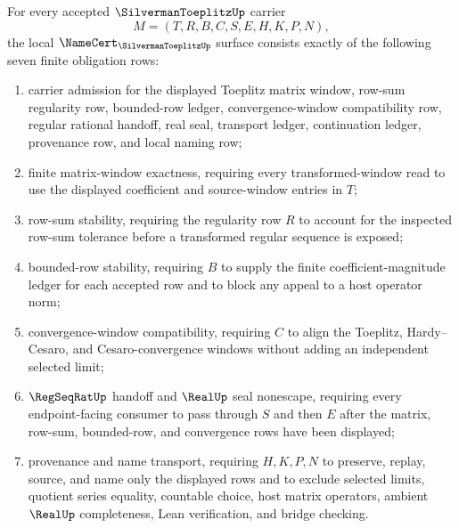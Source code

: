 \begin{theorem}\label{thm:silverman-toeplitz-namecert-obligations}
For every accepted $\SilvermanToeplitzUp$ carrier
$$
M=(T,R,B,C,S,E,H,K,P,N),
$$
the local $\NameCert_{\SilvermanToeplitzUp}$ surface consists exactly of the following seven finite obligation rows:
\begin{enumerate}
\item carrier admission for the displayed Toeplitz matrix window, row-sum regularity row, bounded-row ledger, convergence-window compatibility row, regular rational handoff, real seal, transport ledger, continuation ledger, provenance row, and local naming row;
\item finite matrix-window exactness, requiring every transformed-window read to use the displayed coefficient and source-window entries in $T$;
\item row-sum stability, requiring the regularity row $R$ to account for the inspected row-sum tolerance before a transformed regular sequence is exposed;
\item bounded-row stability, requiring $B$ to supply the finite coefficient-magnitude ledger for each accepted row and to block any appeal to a host operator norm;
\item convergence-window compatibility, requiring $C$ to align the Toeplitz, Hardy--Cesaro, and Cesaro-convergence windows without adding an independent selected limit;
\item $\RegSeqRatUp$ handoff and $\RealUp$ seal nonescape, requiring every endpoint-facing consumer to pass through $S$ and then $E$ after the matrix, row-sum, bounded-row, and convergence rows have been displayed;
\item provenance and name transport, requiring $H,K,P,N$ to preserve, replay, source, and name only the displayed rows and to exclude selected limits, quotient series equality, countable choice, host matrix operators, ambient $\RealUp$ completeness, Lean verification, and bridge checking.
\end{enumerate}
\end{theorem}
